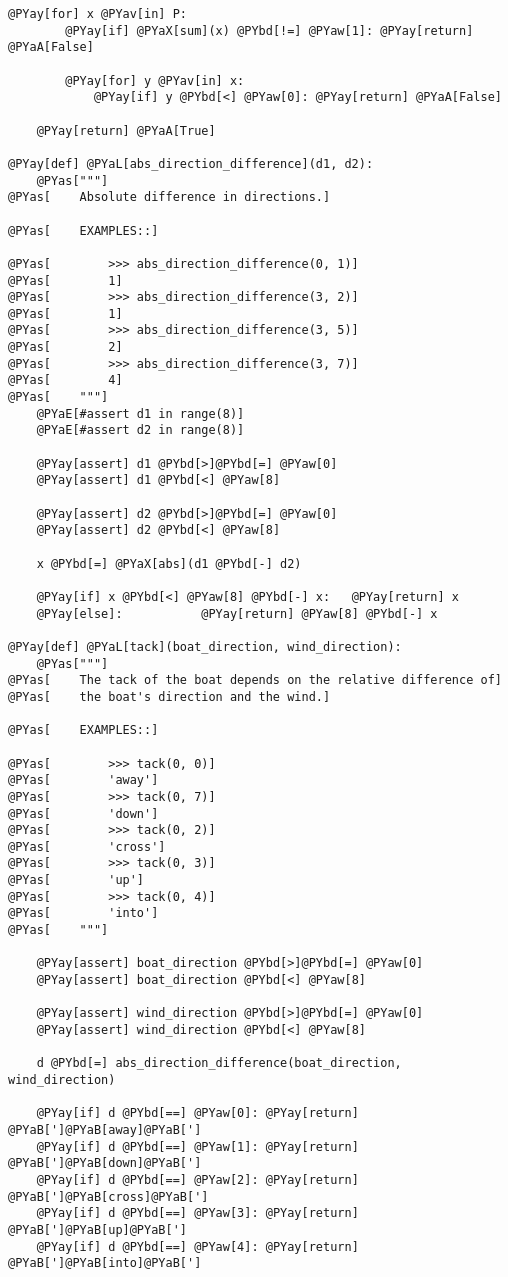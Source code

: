 \begin{Verbatim}[commandchars=@\[\]]
    @PYay[for] x @PYav[in] P:
        @PYay[if] @PYaX[sum](x) @PYbd[!=] @PYaw[1]: @PYay[return] @PYaA[False]

        @PYay[for] y @PYav[in] x:
            @PYay[if] y @PYbd[<] @PYaw[0]: @PYay[return] @PYaA[False]

    @PYay[return] @PYaA[True]

@PYay[def] @PYaL[abs_direction_difference](d1, d2):
    @PYas["""]
@PYas[    Absolute difference in directions.]

@PYas[    EXAMPLES::]

@PYas[        >>> abs_direction_difference(0, 1)]
@PYas[        1]
@PYas[        >>> abs_direction_difference(3, 2)]
@PYas[        1]
@PYas[        >>> abs_direction_difference(3, 5)]
@PYas[        2]
@PYas[        >>> abs_direction_difference(3, 7)]
@PYas[        4]
@PYas[    """]
    @PYaE[#assert d1 in range(8)]
    @PYaE[#assert d2 in range(8)]

    @PYay[assert] d1 @PYbd[>]@PYbd[=] @PYaw[0]
    @PYay[assert] d1 @PYbd[<] @PYaw[8]

    @PYay[assert] d2 @PYbd[>]@PYbd[=] @PYaw[0]
    @PYay[assert] d2 @PYbd[<] @PYaw[8]

    x @PYbd[=] @PYaX[abs](d1 @PYbd[-] d2)

    @PYay[if] x @PYbd[<] @PYaw[8] @PYbd[-] x:   @PYay[return] x
    @PYay[else]:           @PYay[return] @PYaw[8] @PYbd[-] x

@PYay[def] @PYaL[tack](boat_direction, wind_direction):
    @PYas["""]
@PYas[    The tack of the boat depends on the relative difference of]
@PYas[    the boat's direction and the wind.]

@PYas[    EXAMPLES::]

@PYas[        >>> tack(0, 0)]
@PYas[        'away']
@PYas[        >>> tack(0, 7)]
@PYas[        'down']
@PYas[        >>> tack(0, 2)]
@PYas[        'cross']
@PYas[        >>> tack(0, 3)]
@PYas[        'up']
@PYas[        >>> tack(0, 4)]
@PYas[        'into']
@PYas[    """]

    @PYay[assert] boat_direction @PYbd[>]@PYbd[=] @PYaw[0]
    @PYay[assert] boat_direction @PYbd[<] @PYaw[8]

    @PYay[assert] wind_direction @PYbd[>]@PYbd[=] @PYaw[0]
    @PYay[assert] wind_direction @PYbd[<] @PYaw[8]

    d @PYbd[=] abs_direction_difference(boat_direction, wind_direction)

    @PYay[if] d @PYbd[==] @PYaw[0]: @PYay[return] @PYaB[']@PYaB[away]@PYaB[']
    @PYay[if] d @PYbd[==] @PYaw[1]: @PYay[return] @PYaB[']@PYaB[down]@PYaB[']
    @PYay[if] d @PYbd[==] @PYaw[2]: @PYay[return] @PYaB[']@PYaB[cross]@PYaB[']
    @PYay[if] d @PYbd[==] @PYaw[3]: @PYay[return] @PYaB[']@PYaB[up]@PYaB[']
    @PYay[if] d @PYbd[==] @PYaw[4]: @PYay[return] @PYaB[']@PYaB[into]@PYaB[']


\end{Verbatim}
